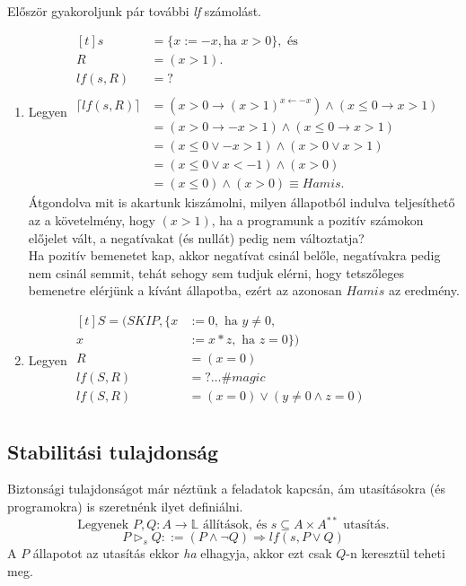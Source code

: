 \documentclass[12pt]{article}
\begin{document}
	\paragraph{}Először gyakoroljunk pár további \textit{lf} számolást.\\
	\begin{enumerate}
		\item  Legyen $\begin{aligned}[t]
		s &= \{x := -x, \text{ha } x>0\}, \text{ és}\\
		R &= (x>1).\\
		lf(s,R) &= ? \\
		\\
		\lceil lf(s,R) \rceil &= (x>0 \rightarrow (x>1)^{x \leftarrow -x}) \land (x \le 0 \rightarrow x > 1) \\
		&= (x>0 \rightarrow -x>1 ) \land (x \le 0 \rightarrow x > 1) \\
		&= (x \le 0 \lor -x > 1) \land (x > 0 \lor x > 1) \\
		&= (x \le 0 \lor x < -1) \land (x>0) \\
		&= (x \le 0) \land (x>0) \equiv Hamis.
		\end{aligned}$\\
		Átgondolva mit is akartunk kiszámolni, milyen állapotból indulva teljesíthető az a követelmény, hogy $(x>1)$, ha a programunk a pozitív számokon előjelet vált, a negatívakat (és nullát) pedig nem változtatja?\\
		Ha pozitív bemenetet kap, akkor negatívat csinál belőle, negatívakra pedig nem csinál semmit, tehát sehogy sem tudjuk elérni, hogy tetszőleges bemenetre elérjünk a kívánt állapotba, ezért az azonosan $Hamis$ az eredmény.
		\item Legyen $\begin{aligned}[t]
		S = (SKIP, \{x&:=0, \text{ ha } y \ne 0, \\
		x&:=x*z, \text{ ha } z = 0\})\\
		R &= (x=0)\\
		lf(S,R) &= ? \dots \#magic\\
		lf(S,R) &= (x=0) \lor (y \ne 0 \land z=0)\\
		\end{aligned}$\\
	\end{enumerate}
	
	\subsection{Stabilitási tulajdonság}
	Biztonsági tulajdonságot már néztünk a feladatok kapcsán, ám utasításokra (és programokra) is szeretnénk ilyet definiálni.
	$$\text{Legyenek }P,Q: A \rightarrow \mathbb{L} \text{ állítások, és } s \subseteq A \times A^{**} \text{ utasítás.}$$
	$$P \vartriangleright_s Q ::= (P \land \neg Q) \Rightarrow lf(s, P \lor Q)$$
	A $P$ állapotot az utasítás ekkor \textit{ha} elhagyja, akkor ezt csak $Q$-n keresztül teheti meg.
	
\end{document}
